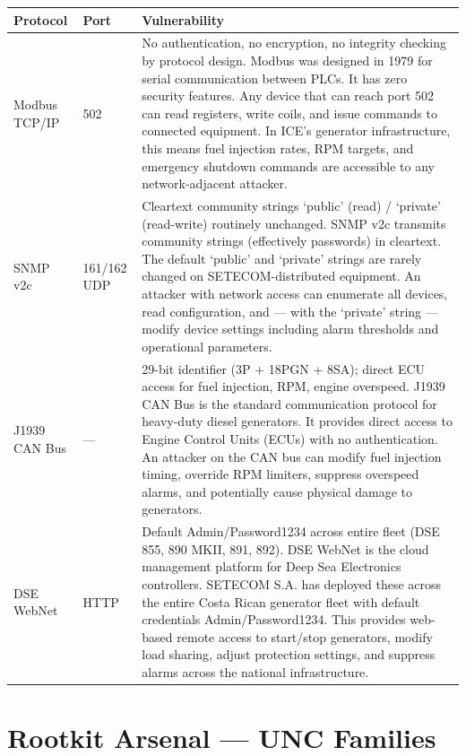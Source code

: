 \documentclass[11pt,a4paper]{article}
\begin{document}
\begin{longtable}{@{} p{2.5cm} p{2cm} p{9cm} @{}}
\toprule
\textbf{Protocol} & \textbf{Port} & \textbf{Vulnerability} \\
\midrule
\endfirsthead
Modbus TCP/IP & 502 & No authentication, no encryption, no integrity checking by protocol design. Modbus was designed in 1979 for serial communication between PLCs. It has zero security features. Any device that can reach port 502 can read registers, write coils, and issue commands to connected equipment. In ICE's generator infrastructure, this means fuel injection rates, RPM targets, and emergency shutdown commands are accessible to any network-adjacent attacker. \\
\midrule
SNMP v2c & 161/162 UDP & Cleartext community strings `public' (read) / `private' (read-write) routinely unchanged. SNMP v2c transmits community strings (effectively passwords) in cleartext. The default `public' and `private' strings are rarely changed on SETECOM-distributed equipment. An attacker with network access can enumerate all devices, read configuration, and --- with the `private' string --- modify device settings including alarm thresholds and operational parameters. \\
\midrule
J1939 CAN Bus & --- & 29-bit identifier (3P + 18PGN + 8SA); direct ECU access for fuel injection, RPM, engine overspeed. J1939 CAN Bus is the standard communication protocol for heavy-duty diesel generators. It provides direct access to Engine Control Units (ECUs) with no authentication. An attacker on the CAN bus can modify fuel injection timing, override RPM limiters, suppress overspeed alarms, and potentially cause physical damage to generators. \\
\midrule
DSE WebNet & HTTP & Default Admin/Password1234 across entire fleet (DSE 855, 890 MKII, 891, 892). DSE WebNet is the cloud management platform for Deep Sea Electronics controllers. SETECOM S.A. has deployed these across the entire Costa Rican generator fleet with default credentials Admin/Password1234. This provides web-based remote access to start/stop generators, modify load sharing, adjust protection settings, and suppress alarms across the national infrastructure. \\
\bottomrule
\end{longtable}

\section{Rootkit Arsenal --- UNC Families}
\end{document}
